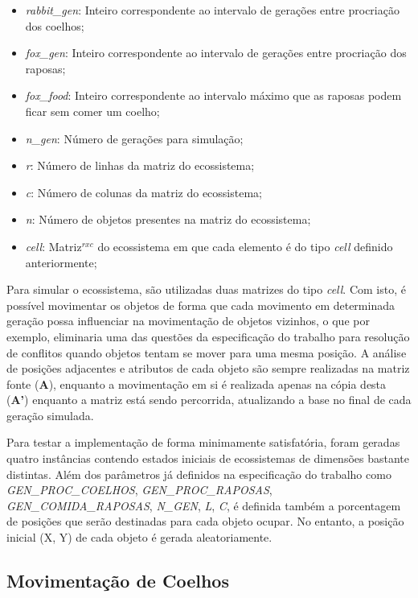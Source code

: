 \documentclass[a4paper, 12pt]{article}
\begin{document}
\begin{itemize}
    \item \emph{rabbit\_gen}: Inteiro correspondente ao intervalo de gerações entre procriação dos coelhos;
    \item \emph{fox\_gen}: Inteiro correspondente ao intervalo de gerações entre procriação dos raposas;
    \item \emph{fox\_food}: Inteiro correspondente ao intervalo máximo que as raposas podem ficar sem comer um coelho;
    \item \emph{n\_gen}: Número de gerações para simulação;
    \item \emph{r}: Número de linhas da matriz do ecossistema;
    \item \emph{c}: Número de colunas da matriz do ecossistema;
    \item \emph{n}: Número de objetos presentes na matriz do ecossistema;
    \item \emph{cell}: Matriz\(^{r x c}\) do ecossistema em que cada elemento é do tipo \emph{cell} definido anteriormente;
\end{itemize}

Para simular o ecossistema, são utilizadas duas matrizes do tipo \emph{cell}. Com isto, é possível movimentar os objetos de forma que cada movimento em determinada geração possa influenciar na movimentação de objetos vizinhos, o que por exemplo, eliminaria uma das questões da especificação do trabalho para resolução de conflitos quando objetos tentam se mover para uma mesma posição. A análise de posições adjacentes e atributos de cada objeto são sempre realizadas na matriz fonte (\textbf{A}), enquanto a movimentação em si é realizada apenas na cópia desta (\textbf{A'}) enquanto a matriz está sendo percorrida, atualizando a base no final de cada geração simulada.

Para testar a implementação de forma minimamente satisfatória, foram geradas quatro instâncias contendo estados iniciais de ecossistemas de dimensões bastante distintas. Além dos parâmetros já definidos na especificação do trabalho como \emph{GEN\_PROC\_COELHOS}, \emph{GEN\_PROC\_RAPOSAS}, \emph{GEN\_COMIDA\_RAPOSAS}, \emph{N\_GEN}, \emph{L}, \emph{C}, é definida também a porcentagem de posições que serão destinadas para cada objeto ocupar. No entanto, a posição inicial (X, Y) de cada objeto é gerada aleatoriamente.

\subsection{Movimentação de Coelhos}
\end{document}
